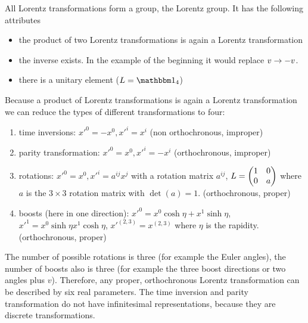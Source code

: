 All Lorentz transformations form a group, the Lorentz group. It has the following attributes
\begin{itemize}
\item the product of two Lorentz transformations is again a Lorentz transformation
\item the inverse exists. In the example of the beginning it would replace $v \rightarrow -v$.
\item there is a unitary element ($L = \ehm_4$)
\end{itemize}
Because a product of Lorentz transformations is again a Lorentz transformation we can reduce the types of different transformations to four:
\begin{enumerate}
\item time inversions: $x'^0 = - x^0, x'^i = x^i$ (non orthochronous, improper)
\item parity transformation: $x'^0 = x^0, x'^i = - x^i$ (orthochronous, improper)
\item rotations: $x'^0 = x^0, x'^i = a^{ij} x^j$ with a rotation matrix $a^{ij}$, $L = \begin{pmatrix}1&0\\0&a\end{pmatrix}$ where $a$ is the $3\times 3$ rotation matrix with $\det(a) = 1$. (orthochronous, proper)
\item boosts (here in one direction): $x'^0 = x^0 \cosh \eta + x^1 \sinh \eta$, $x'^1 = x^0 \sinh\eta x^1 \cosh\eta$, $x'^{(2,3)} = x^{(2,3)}$ where $\eta$ is the rapidity. (orthochronous, proper)
\end{enumerate}
The number of possible rotations is three (for example the Euler angles), the number of boosts also is three (for example the three boost directions or two angles plus $v$). Therefore, any proper, orthochronous Lorentz transformation can be described by six real parameters. The time inversion and parity transformation do not have infinitesimal representations, because they are discrete transformations.

